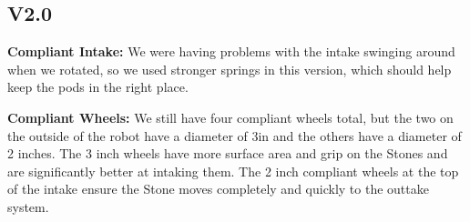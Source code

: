
\subsection{V2.0}

\par \textbf{Compliant Intake:} We were having problems with the intake swinging around when we rotated, so we used stronger springs in this version, which should help keep the pods in the right place.

\par \textbf{Compliant Wheels:} We still have four compliant wheels total, but the two on the outside of the robot have a diameter of 3in and the others have a diameter of 2 inches. The 3 inch wheels have more surface area and grip on the Stones and are significantly better at intaking them. The 2 inch compliant wheels at the top of the intake ensure the Stone moves completely and quickly to the outtake system.

